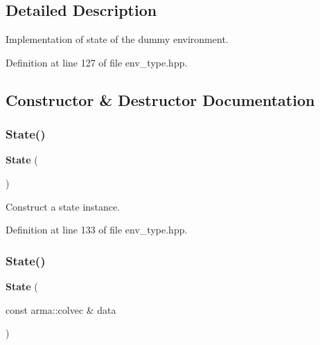 \subsection{Detailed Description}
Implementation of state of the dummy environment. 

Definition at line 127 of file env\+\_\+type.\+hpp.



\subsection{Constructor \& Destructor Documentation}
\mbox{\label{classmlpack_1_1rl_1_1ContinuousActionEnv_1_1State_a790355057d12e9c1ce7643551c16fecd}} 
\subsubsection{State()\hspace{0.1cm}{\footnotesize\ttfamily [1/2]}}
{\footnotesize\ttfamily \textbf{ State} (\begin{DoxyParamCaption}{ }\end{DoxyParamCaption})\hspace{0.3cm}{\ttfamily [inline]}}



Construct a state instance. 



Definition at line 133 of file env\+\_\+type.\+hpp.

\mbox{\label{classmlpack_1_1rl_1_1ContinuousActionEnv_1_1State_a8bc7967f6d91a3c94f9b3f502297a926}} 
\subsubsection{State()\hspace{0.1cm}{\footnotesize\ttfamily [2/2]}}
{\footnotesize\ttfamily \textbf{ State} (\begin{DoxyParamCaption}\item[{const arma\+::colvec \&}]{data }\end{DoxyParamCaption})\hspace{0.3cm}{\ttfamily [inline]}}



